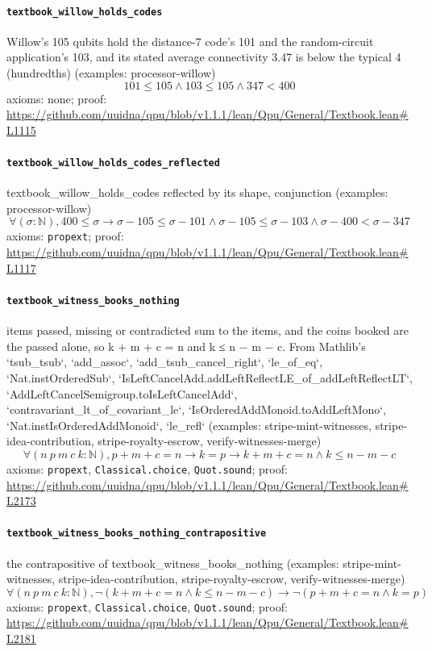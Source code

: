 \documentclass[11pt]{article}
\begin{document}
\paragraph{\texttt{textbook\_willow\_holds\_codes}}
Willow's 105 qubits hold the distance-7 code's 101 and the random-circuit application's 103, and its stated average connectivity 3.47 is below the typical 4 (hundredths) (examples: processor-willow)
\[ 101 \le 105 \land 103 \le 105 \land 347 < 400 \]
\noindent axioms: none; proof: \url{https://github.com/uuidna/qpu/blob/v1.1.1/lean/Qpu/General/Textbook.lean\#L1115}

\paragraph{\texttt{textbook\_willow\_holds\_codes\_reflected}}
textbook\_willow\_holds\_codes reflected by its shape, conjunction (examples: processor-willow)
\[ \forall (\sigma : \mathbb{N}), 400 \le \sigma \to \sigma - 105 \le \sigma - 101 \land \sigma - 105 \le \sigma - 103 \land \sigma - 400 < \sigma - 347 \]
\noindent axioms: \texttt{propext}; proof: \url{https://github.com/uuidna/qpu/blob/v1.1.1/lean/Qpu/General/Textbook.lean\#L1117}

\paragraph{\texttt{textbook\_witness\_books\_nothing}}
items passed, missing or contradicted sum to the items, and the coins booked are the passed alone, so k + m + c = n and k ≤ n − m − c. From Mathlib's `tsub\_tsub`, `add\_assoc`, `add\_tsub\_cancel\_right`, `le\_of\_eq`, `Nat.instOrderedSub`, `IsLeftCancelAdd.addLeftReflectLE\_of\_addLeftReflectLT`, `AddLeftCancelSemigroup.toIsLeftCancelAdd`, `contravariant\_lt\_of\_covariant\_le`, `IsOrderedAddMonoid.toAddLeftMono`, `Nat.instIsOrderedAddMonoid`, `le\_refl` (examples: stripe-mint-witnesses, stripe-idea-contribution, stripe-royalty-escrow, verify-witnesses-merge)
\[ \forall (n\ p\ m\ c\ k : \mathbb{N}), p + m + c = n \to k = p \to k + m + c = n \land k \le n - m - c \]
\noindent axioms: \texttt{propext}, \texttt{Classical.choice}, \texttt{Quot.sound}; proof: \url{https://github.com/uuidna/qpu/blob/v1.1.1/lean/Qpu/General/Textbook.lean\#L2173}

\paragraph{\texttt{textbook\_witness\_books\_nothing\_contrapositive}}
the contrapositive of textbook\_witness\_books\_nothing (examples: stripe-mint-witnesses, stripe-idea-contribution, stripe-royalty-escrow, verify-witnesses-merge)
\[ \forall (n\ p\ m\ c\ k : \mathbb{N}), \neg (k + m + c = n \land k \le n - m - c) \to \neg (p + m + c = n \land k = p) \]
\noindent axioms: \texttt{propext}, \texttt{Classical.choice}, \texttt{Quot.sound}; proof: \url{https://github.com/uuidna/qpu/blob/v1.1.1/lean/Qpu/General/Textbook.lean\#L2181}
\end{document}
